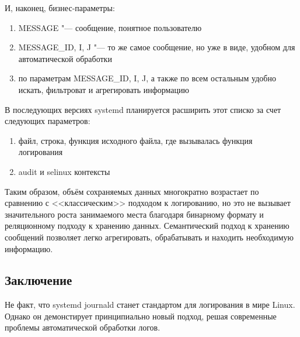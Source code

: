 \documentclass[10pt, a5paper]{article}
\begin{document}
И, наконец, бизнес-параметры:

\begin{enumerate}
  \item MESSAGE "--- сообщение, понятное пользователю
  \item MESSAGE\_ID, I, J "--- то же самое сообщение, но уже в виде, удобном для автоматической обработки
  \item по параметрам MESSAGE\_ID, I, J, а также по всем остальным удобно искать, фильтроват и агрегировать информацию
\end{enumerate}

В последующих версиях systemd планируется расширить этот списко за счет следующих параметров:

\begin{enumerate}
  \item файл, строка, функция исходного файла, где вызывалась \linebreak функция логирования
  \item audit и selinux контексты
\end{enumerate}

Таким образом, объём сохраняемых данных многократно возрастает  по сравнению с <<классическим>> подходом к логированию, но это не вызывает значительного роста занимаемого места благодаря бинарному формату и реляционному подходу к хранению данных. Семантический подход к хранению сообщений позволяет легко агрегировать, обрабатывать и находить необходимую информацию.

\subsection*{Заключение}

Не факт, что systemd journald станет стандартом для логирования в мире Linux. Однако он демонстирует принципиально новый подход, решая современные проблемы автоматической обработки логов.
\end{document}
